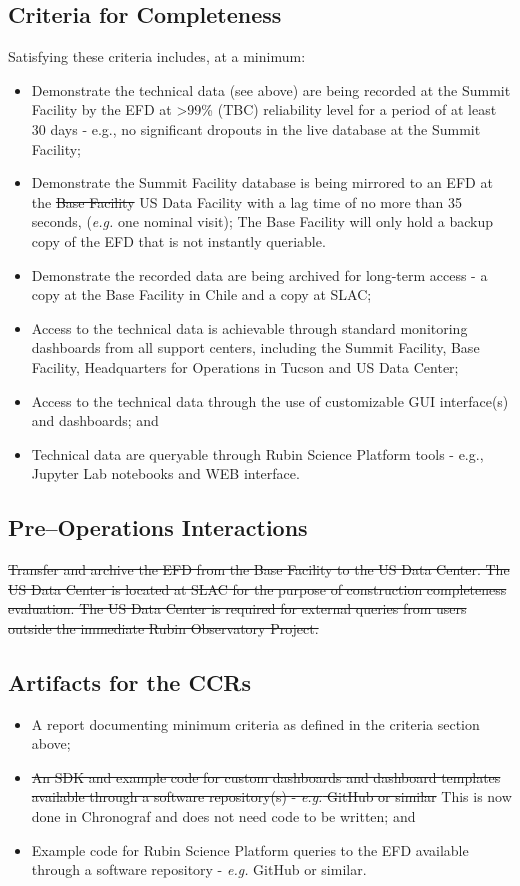 \subsection{Criteria for Completeness}

Satisfying these criteria includes, at a minimum:
\begin{itemize}
	\item Demonstrate the technical data (see above) are being recorded at the Summit Facility by the EFD at >99\% (TBC) reliability level for a period of at least 30 days - e.g., no significant dropouts in the live database at the Summit Facility;
	\item Demonstrate the Summit Facility database is being mirrored to an EFD at the \sout{Base Facility} US Data Facility with a lag time of no more than 35 seconds, ({\it e.g.} one nominal visit); The Base Facility will only hold a backup copy of the EFD that is not instantly queriable.
	\item Demonstrate the recorded data are being archived for long-term access - a copy at the Base Facility in Chile and a copy at SLAC;
	\item Access to the technical data is achievable through standard monitoring dashboards from all support centers, including the Summit Facility, Base Facility, Headquarters for Operations in Tucson and US Data Center;
	\item Access to the technical data through the use of customizable GUI interface(s) and dashboards; and
	\item Technical data are queryable through Rubin Science Platform tools - e.g., Jupyter Lab notebooks and WEB interface.
\end{itemize}

\subsection{Pre--Operations Interactions}

\sout{Transfer and archive the EFD from the Base Facility to the US Data Center. The US Data Center is located at SLAC for the purpose of construction completeness evaluation. The US Data Center is required for external queries from users outside the immediate Rubin Observatory Project.}

\subsection{Artifacts for the CCRs}
\begin{itemize}
	\item A report documenting minimum criteria as defined in the criteria section above;
	\item \sout{An SDK and example code for custom dashboards and dashboard templates available through a software repository(s) - {\it e.g.} GitHub or similar} This is now done in Chronograf and does not need code to be written; and
	\item Example code for Rubin Science Platform queries to the EFD available through a software repository - {\it e.g.} GitHub or similar.	
\end{itemize}